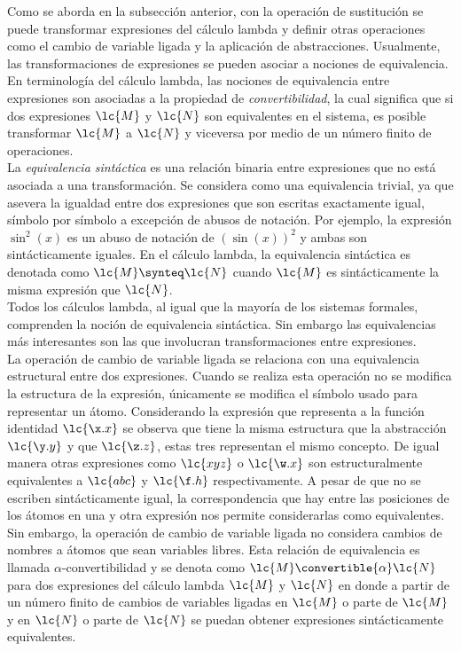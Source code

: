 Como se aborda en la subsección anterior, con la operación de sustitución se
puede transformar expresiones del cálculo lambda y definir otras operaciones
como el cambio de variable ligada y la aplicación de abstracciones. Usualmente,
las transformaciones de expresiones se pueden asociar a nociones de
equivalencia. En terminología del cálculo lambda, las nociones de equivalencia
entre expresiones son asociadas a la propiedad de \emph{convertibilidad}, la
cual significa que si dos expresiones \(\lc{M}\) y \(\lc{N}\) son equivalentes en
el sistema, es posible transformar \(\lc{M}\) a \(\lc{N}\) y viceversa por medio
de un número finito de operaciones. \\

La \emph{equivalencia sintáctica} es una relación binaria entre expresiones que
no está asociada a una transformación. Se considera como una equivalencia
trivial, ya que asevera la igualdad entre dos expresiones que son escritas
exactamente igual, símbolo por símbolo a excepción de abusos de notación. Por
ejemplo, la expresión \(\sin^{2}\left( x \right)\) es un abuso de notación de
\(\left( \sin\left( x \right) \right)^{2}\) y ambas son sintácticamente iguales.
En el cálculo lambda, la equivalencia sintáctica es denotada como \(\lc{M}
\synteq \lc{N}\) cuando \(\lc{M}\) es sintácticamente la misma expresión que
\(\lc{N}\).
\\

Todos los cálculos lambda, al igual que la mayoría de los sistemas formales,
comprenden la noción de equivalencia sintáctica. Sin embargo las equivalencias
más interesantes son las que involucran transformaciones entre expresiones. \\

La operación de cambio de variable ligada se relaciona con una equivalencia
estructural entre dos expresiones. Cuando se realiza esta operación no se
modifica la estructura de la expresión, únicamente se modifica el símbolo usado
para representar un átomo. Considerando la expresión que representa a la función
identidad \(\lc{\x.x}\) se observa que tiene la misma estructura que la
abstracción \(\lc{\y.y}\) y que \(\lc{\z.z}\), estas tres representan el mismo
concepto. De igual manera otras expresiones como \(\lc{x y z}\) o \(\lc{\w.x}\)
son estructuralmente equivalentes a \(\lc{a b c}\) y \(\lc{\f.h}\)
respectivamente. A pesar de que no se escriben sintácticamente igual, la
correspondencia que hay entre las posiciones de los átomos en una y otra
expresión nos permite considerarlas como equivalentes. Sin embargo, la operación
de cambio de variable ligada no considera cambios de nombres a átomos que sean
variables libres. Esta relación de equivalencia es llamada
\(\alpha\)-convertibilidad y se denota como \(\lc{M} \convertible{\alpha}
\lc{N}\) para dos expresiones del cálculo lambda \(\lc{M}\) y \(\lc{N}\) en
donde a partir de un número finito de cambios de variables ligadas en \(\lc{M}\)
o parte de \(\lc{M}\) y en \(\lc{N}\) o parte de \(\lc{N}\) se puedan obtener
expresiones sintácticamente equivalentes. \\

